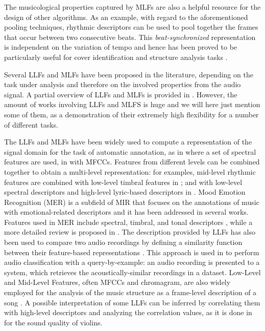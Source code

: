 The musicological properties captured by MLFs are also a helpful resource for the design of other algorithms. As an example, with regard to the aforementioned pooling techniques, rhythmic descriptors can be used to pool together the frames that occur between two consecutive beats. This \textit{beat-synchronized} representation is independent on the variation of tempo and hence has been proved to be particularly useful for cover identification and structure analysis tasks \cite{Ellis2007,Nieto2D}.

Several LLFs and MLFs have been proposed in the literature, depending on the task under analysis and therefore on the involved properties from the audio signal. A partial overview of LLFs and MLFs is provided in  \cite{mckinney2003features,Kim2005,weihs2016music}. However, the amount of works involving LLFs and MLFS is huge and we will here just mention some of them, as a demonstration of their extremely high flexibility for a number of different tasks.

The LLFs and MLFs have been widely used to compute a representation of the signal domain for the task of automatic annotation, as in \cite{eck2008automatic} where a set of spectral features are used, in \cite{barrington2008auto} with MFCCs. Features from different levels can be combined together to obtain a multi-level representation: for examples, mid-level rhythmic features are combined with low-level timbral features in \cite{orio2013combining}; and with low-level spectral descriptors and high-level lyric-based descriptors in \cite{neumayer2007integration}. Mood Emotion Recognition (MER) is a subfield of MIR that focuses on the annotations of music with emotional-related descriptors and it has been addressed in several works. Features used in MER include spectral, timbral, and tonal descriptors \cite{schmidt2010prediction, xianyu2016svr, deng2015dynamic, chen2014linear}, while a more detailed review is proposed in \cite{Barthet2012}. The description provided by LLFs has also been used to compare two audio recordings by defining a similarity function between their feature-based representations \cite{pampalk2005improvements}. This approach is used in \cite{Kim2004} to perform audio classification with a query-by-example: an audio recording is presented to a system, which retrieves the acoustically-similar recordings in a dataset. Low-Level and Mid-Level Features, often MFCCs and chromagram, are also widely employed for the analysis of the music structure as a frame-level description of a song \cite{levy2008structural,ong2005semantic,kaiser2012music}. A possible interpretation of some LLFs can be inferred by correlating them with high-level descriptors and analyzing the correlation values, as it is done in \cite{Zanoni2014} for the sound quality of violins.


